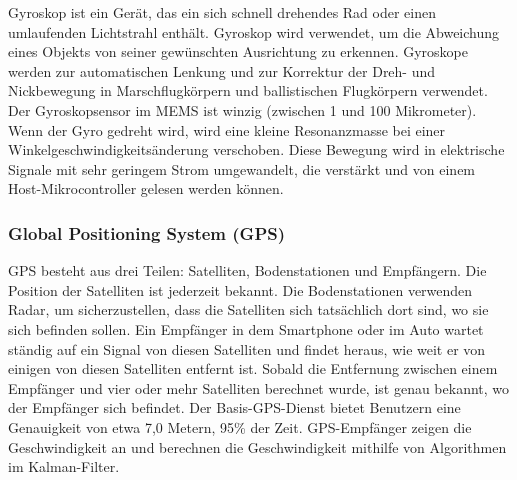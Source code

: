 Gyroskop ist ein Gerät, das ein sich schnell drehendes Rad oder einen umlaufenden Lichtstrahl enthält. Gyroskop wird verwendet, um die Abweichung eines Objekts von seiner gewünschten Ausrichtung zu erkennen. Gyroskope werden zur automatischen Lenkung und zur Korrektur der Dreh- und Nickbewegung in Marschflugkörpern und ballistischen Flugkörpern verwendet.\citep{RogersGyro}
Der Gyroskopsensor im MEMS ist winzig (zwischen 1 und 100 Mikrometer). Wenn der Gyro gedreht wird, wird eine kleine Resonanzmasse bei einer Winkelgeschwindigkeitsänderung verschoben. Diese Bewegung wird in elektrische Signale mit sehr geringem Strom umgewandelt, die verstärkt und von einem Host-Mikrocontroller gelesen werden können.\citep{sparkfunGyro}


%
%
%
%

\subsubsection{Global Positioning System (GPS)}

GPS besteht aus drei Teilen: Satelliten, Bodenstationen und Empfängern. Die Position der Satelliten ist jederzeit bekannt. Die Bodenstationen verwenden Radar, um sicherzustellen, dass die Satelliten sich tatsächlich dort sind, wo sie sich befinden sollen.
Ein Empfänger in dem Smartphone oder im Auto wartet ständig auf ein Signal von diesen Satelliten und findet heraus, wie weit er von einigen von diesen Satelliten entfernt ist. Sobald die Entfernung zwischen einem Empfänger und vier oder mehr Satelliten berechnet wurde, ist genau bekannt, wo der Empfänger sich befindet. Der Basis-GPS-Dienst bietet Benutzern eine Genauigkeit von etwa 7,0 Metern, 95\% der Zeit. GPS-Empfänger zeigen die Geschwindigkeit an und berechnen die Geschwindigkeit mithilfe von Algorithmen im Kalman-Filter.\citep{Nasa2019}\citep{FAAGPS}\citep{YeazelGPS}

